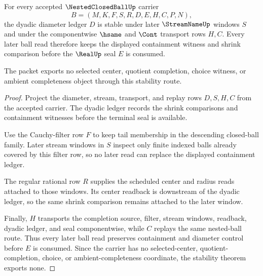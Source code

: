 \begin{theorem}
\label{thm:nested-closed-ball-diameter-tail-stability}
For every accepted $\NestedClosedBallUp$ carrier
$$
B=(M,K,F,S,R,D,E,H,C,P,N),
$$
the dyadic diameter ledger $D$ is stable under later $\StreamNameUp$ windows $S$ and under the componentwise $\hsame$ and $\Cont$ transport rows $H,C$. Every later ball read therefore keeps the displayed containment witness and shrink comparison before the $\RealUp$ seal $E$ is consumed.

The packet exports no selected center, quotient completion, choice witness, or ambient completeness object through this stability route.
\end{theorem}
\begin{proof}
Project the diameter, stream, transport, and replay rows $D,S,H,C$ from the accepted carrier. The dyadic ledger records the shrink comparisons and containment witnesses before the terminal seal is available.

Use the Cauchy-filter row $F$ to keep tail membership in the descending closed-ball family. Later stream windows in $S$ inspect only finite indexed balls already covered by this filter row, so no later read can replace the displayed containment ledger.

The regular rational row $R$ supplies the scheduled center and radius reads attached to those windows. Its center readback is downstream of the dyadic ledger, so the same shrink comparison remains attached to the later window.

Finally, $H$ transports the completion source, filter, stream windows, readback, dyadic ledger, and seal componentwise, while $C$ replays the same nested-ball route. Thus every later ball read preserves containment and diameter control before $E$ is consumed. Since the carrier has no selected-center, quotient-completion, choice, or ambient-completeness coordinate, the stability theorem exports none.
\end{proof}

